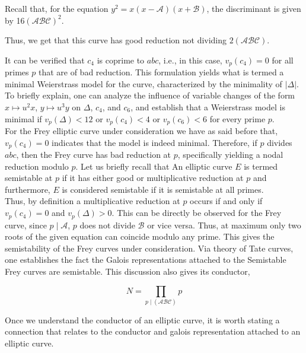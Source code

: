 Recall that, for the equation \( y^2 = x(x - \mathcal{A})(x + \mathcal{B}) \), the discriminant is given by 16$(\mathcal{A}\mathcal{B}\mathcal{C})^2.$

Thus, we get that this curve has good reduction not dividing $2(\mathcal{A}\mathcal{B}\mathcal{C})$. 

It can be verified that \( c_{4} \) is coprime to \( abc \), i.e., in this case, \( v_{p}(c_{4}) = 0 \) for all primes \( p \) that are of bad reduction. This formulation yields what is termed a minimal Weierstrass model for the curve, characterized by the minimality of \( |\Delta| \). To briefly explain, one can analyze the influence of variable changes of the form \( x \mapsto u^2 x \), \( y \mapsto u^3 y \) on \( \Delta \), \( c_{4} \), and \( c_{6} \), and establish that a Weierstrass model
is minimal if $v_{p}(\Delta)<12$ or $v_{p}\left(c_{4}\right)<4$ or $v_{p}\left(c_{6}\right)<6$ for every prime $p$.\\

For the Frey elliptic curve under consideration we have as said before that, \( v_{p}(c_{4}) = 0 \) indicates that the model is indeed minimal. Therefore, if \( p \) divides \( abc \), then the Frey curve  has bad reduction at \( p \), specifically yielding a nodal reduction modulo \( p \).
Let us briefly recall that An elliptic curve \( E \) is termed semistable at \( p \) if it has either good or multiplicative reduction at \( p \) and furthermore, \( E \) is considered semistable if it is semistable at all primes. \\


Thus, by definition a multiplicative reduction at \( p \) occurs if and only if \( v_{p}(c_{4}) = 0 \) and \( v_{p}(\Delta) > 0 \). This can be directly be observed for the Frey curve, since $p \mid \mathcal{A}$, $p$ does not divide $\mathcal{B}$ or vice versa. Thus, at maximum only two roots of the given equation can coincide modulo any prime. This gives the semistability of the Frey curves under consideration. Via theory of Tate curves, one establishes the fact the Galois representations attached to the Semistable Frey curves are semistable. This discussion also gives its conductor,

$$
N=\prod_{p \mid(\mathcal{A}\mathcal{B}\mathcal{C})} p
$$

Once we understand the conductor of an elliptic curve, it is worth stating a connection that relates to the conductor and galois representation attached to an elliptic curve. 

